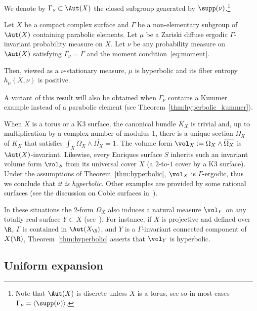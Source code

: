 We denote by $\Gamma_\nu \subset \Aut(X)$
the closed subgroup generated by $\supp(\nu)$.\footnote{\label{page:discrete}Note that $\Aut(X)$ is discrete unless
$X$ is a torus, see \cite[\S 3]{stiffness}
so in most cases $\Gamma_\nu = \langle \supp(\nu) \rangle$.}

\begin{thm}\label{thm:hyperbolic}
Let $X$ be a compact complex surface and
$\Gamma$ be a non-elementary subgroup of $\Aut(X)$ containing parabolic elements.
Let $\mu$ be a Zariski diffuse ergodic $\Gamma$-invariant probability measure on $X$.
Let $\nu$ be any probability measure on $\Aut(X)$
satisfying $\Gamma_\nu=\Gamma$ and the moment condition~\eqref{eq:moment}.

Then, viewed as a $\nu$-stationary measure, $\mu$ is hyperbolic and its fiber entropy $h_\mu(X,\nu)$ is positive.
\end{thm}

A variant of this result will also be obtained when $\Gamma_\nu$ contains a Kummer example
instead of a parabolic element (see Theorem~\ref{thm:hyperbolic_kummer}).

\begin{example}\label{eg:K3_intro} When $X$ is a torus or a K3 surface, the canonical bundle $K_X$ is trivial and, up to multiplication by a complex number of modulus $1$, there is
a unique section $\Omega_X$ of $K_X$ that satisfies $\int_X\Omega_X\wedge \overline{\Omega_X}=1$. The volume form $\vol_X:=\Omega_X\wedge \overline{\Omega_X}$
is $\Aut(X)$-invariant. Likewise, every Enriques surface $S$ inherits such an invariant volume form $\vol_S$ from its universal cover $X$ (a $2$-to-$1$ cover by a K3 surface).
Under the assumptions of Theorem~\ref{thm:hyperbolic}, $\vol_X$ is $\Gamma$-ergodic,
thus we conclude that {\textit{it is hyperbolic}}. Other examples are provided by some rational surfaces (see the discussion on Coble surfaces in~\cite{Simons}).

In these situations the 2-form $\Omega_X$ also induces a natural measure $\vol_Y$ on any totally real surface $Y\subset X$ (see~\cite[Rem.\,2.3]{invariant}). For instance, if $X$ is projective and defined over $\R$, $\Gamma$ is contained in $\Aut(X_\R)$, and $Y$ is a $\Gamma$-invariant connected component of $X(\R)$, Theorem~\ref{thm:hyperbolic} asserts that $\vol_Y$ is hyperbolic.
\end{example}

\subsection{Uniform expansion}\label{subs:UE_intro}

